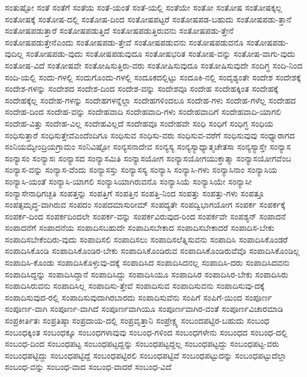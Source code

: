 {ಸಂತುಷ್ಟೋ
ಸಂತೆ
ಸಂತೆಗೆ
ಸಂತೆಯ
ಸಂತೆ-ಯಂತೆ
ಸಂತೆ-ಯಲ್ಲಿ
ಸಂತೆಯೇ
ಸಂತೋ
ಸಂತೋಷ
ಸಂತೋಷಕ್ಕಲ್ಲ
ಸಂತೋಷಕ್ಕೆ
ಸಂತೋಷ-ದಲ್ಲಿ
ಸಂತೋಷ-ದಿಂದ
ಸಂತೋಷಪಟ್ಟರೆ
ಸಂತೋಷಪಡ-ಬಹುದು
ಸಂತೋಷಪಡು-ತ್ತಾನೆ
ಸಂತೋಷಪಡುತ್ತಾರೆ
ಸಂತೋಷಪಡುತ್ತಿದೆ
ಸಂತೋಷಪಡುತ್ತಿರುವನು
ಸಂತೋಷಪಡು-ತ್ತೇನೆ
ಸಂತೋಷಪಡುತ್ತೇನೆಎಂದು
ಸಂತೋಷಪಡು-ತ್ತೇವೆ
ಸಂತೋಷಪಡುವನು
ಸಂತೋಷಪಡುವನೊ
ಸಂತೋಷಪಡು-ವುದಿಲ್ಲ
ಸಂತೋಷಪಡು-ವುದು
ಸಂತೋಷಪಡುವುದೂ
ಸಂತೋಷಭರಿತ
ಸಂತೋಷ-ವನ್ನು
ಸಂತೋಷ-ವಾಗು-ವುದು
ಸಂತೋಷ-ವಿದೆ
ಸಂತೋಷವೇ
ಸಂತೋಷಿಸುತ್ತಿರು-ವರು
ಸಂತೋಷಿಸುವುದೂ
ಸಂತೋಷಿಸುವುದೇ
ಸಂದಿಗ್ಧ
ಸಂದಿ-ನಿಂದ
ಸಂದಿ-ಯಲ್ಲಿ
ಸಂದು-ಗಳಲ್ಲಿ
ಸಂದುಗೊಂದು-ಗಳಲ್ಲಿ
ಸಂದೂಕದಲ್ಲಿಟ್ಟು
ಸಂದೂಕಿ-ನಲ್ಲಿ
ಸಂದೃಶ್ಯಂತೇ
ಸಂದೇಶ
ಸಂದೇಶಕ್ಕೆ
ಸಂದೇಶ-ಗಳನ್ನು
ಸಂದೇಶದ
ಸಂದೇಶ-ದಿಂದ
ಸಂದೇಶ-ವನ್ನು
ಸಂದೇಶವೂ
ಸಂದೇಹ
ಸಂದೇಹಕ್ಕಿಂತ
ಸಂದೇಹಕ್ಕೆ
ಸಂದೇಹಕ್ಕೆಲ್ಲ
ಸಂದೇಹ-ಗಳನ್ನು
ಸಂದೇಹಗಳನ್ನೆಲ್ಲಾ
ಸಂದೇಹಗಳಿಂದಲೂ
ಸಂದೇಹ-ಗಳು
ಸಂದೇಹ-ಗಳೆಲ್ಲ
ಸಂದೇಹದ
ಸಂದೇಹ-ದಿಂದ
ಸಂದೇಹ-ವನ್ನು
ಸಂದೇಹವಾದಿ
ಸಂದೇಹವಾದಿ-ಗಳು
ಸಂದೇಹವಾದಿಗೆ
ಸಂದೇಹವಾದಿ-ಯಾಗಲಿ
ಸಂದೇಹ-ವಿತ್ತು
ಸಂದೇಹ-ವಿಲ್ಲ
ಸಂದೇಹವಿಲ್ಲದೆ
ಸಂದೇಹವೂ
ಸಂದೇಹವೇ
ಸಂಧಿ
ಸಂಧಿಗೆ
ಸಂಧಿಗ್ಧ
ಸಂಧಿಯ
ಸಂಧಿಸುತ್ತಾರೆ
ಸಂಧಿಸುತ್ತೇವೆಎಂದೆಂದಿಗೂ
ಸಂಧಿಸುವ
ಸಂಧಿಸು-ವರು
ಸಂಧಿಸುವ-ವರೆಗೆ
ಸಂಧಿಸುವುವು
ಸಂಧ್ಯಾರಾಗದ
ಸಂನಿಯಮ್ಯೇಂದ್ರಿಯಗ್ರಾಮಂ
ಸಂನಿವಿಷ್ಟೋ
ಸಂನ್ಯಸನಾದೇವ
ಸಂನ್ಯಸ್ಯ
ಸಂನ್ಯಸ್ಯಾಧ್ಯಾತ್ಮಚೇತಸಾ
ಸಂನ್ಯಸ್ಯಾಸ್ತೇ
ಸಂನ್ಯಾಸ
ಸಂನ್ಯಾಸಂ
ಸಂನ್ಯಾಸಃ
ಸಂನ್ಯಾಸದ
ಸಂನ್ಯಾಸಮಿತಿ
ಸಂನ್ಯಾಸಯೋಗ
ಸಂನ್ಯಾಸಯೋಗಯುಕ್ತಾತ್ಮಾ
ಸಂನ್ಯಾಸಯೋಗವೆಂಬ
ಸಂನ್ಯಾಸ-ವನ್ನು
ಸಂನ್ಯಾಸ-ವೆಂದು
ಸಂನ್ಯಾಸಸ್ತು
ಸಂನ್ಯಾಸಸ್ಯ
ಸಂನ್ಯಾಸಿ
ಸಂನ್ಯಾಸಿ-ಗಳು
ಸಂನ್ಯಾಸಿನಾಂ
ಸಂನ್ಯಾಸಿಯ
ಸಂನ್ಯಾಸಿ-ಯಂತೆ
ಸಂನ್ಯಾಸಿ-ಯಾಗಲಿ
ಸಂನ್ಯಾಸಿಯಾಗಿರುವನೊ
ಸಂನ್ಯಾಸಿಯೆ
ಸಂನ್ಯಾಸಿಯೇ
ಸಂನ್ಯಾಸೀ
ಸಂನ್ಯಾಸೇನಾಧಿಗಚ್ಛತಿ
ಸಂಪತ್ತನ್ನು
ಸಂಪತ್ತಿಗೆ
ಸಂಪತ್ತಿನ
ಸಂಪತ್ತಿ-ನಿಂದ
ಸಂಪತ್ತು
ಸಂಪತ್ತು-ಗಳು
ಸಂಪತ್ತೂ
ಸಂಪತ್ಸಮೃದ್ಧ-ವಾಗಿರುವ
ಸಂಪದಂ
ಸಂಪದಮಾಸುರೀಮ್
ಸಂಪದ್ಯತೇ
ಸಂಪದ್ವಿಭಾಗಯೋಗ
ಸಂಪರ್ಕ
ಸಂಪರ್ಕಕ್ಕೆ
ಸಂಪರ್ಕ-ದಿಂದ
ಸಂಪರ್ಕದಿಂದಲೇ
ಸಂಪರ್ಕ-ವನ್ನು
ಸಂಪರ್ಕವಿರುವುದ-ರಿಂದ
ಸಂಪರ್ಕವೇ
ಸಂಪಶ್ಯನ್
ಸಂಪಾದನೆ
ಸಂಪಾದನೆಗೆ
ಸಂಪಾದನೆಯ
ಸಂಪಾದಿಸಬಹುದೇ
ಸಂಪಾದಿಸಬೇಕಾದ
ಸಂಪಾದಿಸಬೇಕಾದರೆ
ಸಂಪಾದಿಸ-ಬೇಕು
ಸಂಪಾದಿಸಬೇಕೆಂದಿರು-ವುದು
ಸಂಪಾದಿಸಲಿ
ಸಂಪಾದಿಸಲು
ಸಂಪಾದಿಸಲೆತ್ನಿಸುವನು
ಸಂಪಾದಿಸಿ
ಸಂಪಾದಿಸಿಕೊಂಡರೆ
ಸಂಪಾದಿಸಿಕೊಂಡಿ
ಸಂಪಾದಿಸಿಕೊಂಡಿರ-ಬೇಕು
ಸಂಪಾದಿಸಿಕೊಂಡಿರುವ
ಸಂಪಾದಿಸಿಕೊಂಡಿರುವೆವೊ
ಸಂಪಾದಿಸಿಕೊಂಡಿಲ್ಲ
ಸಂಪಾದಿಸಿ-ಕೊಂಡು
ಸಂಪಾದಿಸಿಕೊಳ್ಳುವು-ದಕ್ಕೆ
ಸಂಪಾದಿಸಿದ
ಸಂಪಾದಿಸಿದನಲ್ಲ
ಸಂಪಾದಿಸಿ-ದರು
ಸಂಪಾದಿಸಿದವನು
ಸಂಪಾದಿಸಿದ್ದನ್ನು
ಸಂಪಾದಿಸಿದ್ದಾನೆ
ಸಂಪಾದಿಸಿದ್ದು
ಸಂಪಾದಿಸಿಯೂ
ಸಂಪಾದಿಸಿರ
ಸಂಪಾದಿಸಿರ-ಬೇಕು
ಸಂಪಾದಿಸಿರು
ಸಂಪಾದಿಸಿರುವನು
ಸಂಪಾದಿಸಿಲ್ಲ
ಸಂಪಾದಿಸು-ತ್ತೇವೆ
ಸಂಪಾದಿಸುವ
ಸಂಪಾದಿಸುವನು
ಸಂಪಾದಿಸುವು-ದಕ್ಕೆ
ಸಂಪಾದಿಸುವುದ-ರಲ್ಲಿ
ಸಂಪಾದಿಸುವುದಾಗಿರಬಾರದು
ಸಂಪಾದಿಸುವೆನು
ಸಂಪಿಗೆ
ಸಂಪಿಗೆ-ಯಿಂದ
ಸಂಪೂರ್ಣ
ಸಂಪೂರ್ಣ-ವಾಗಿ
ಸಂಪೂರ್ಣ-ವಾಗಿದೆ
ಸಂಪೂರ್ಣವಾಗಿಯೂ
ಸಂಪೂರ್ಣವಾಗಿರ-ವಂತೆ
ಸಂಪೂರ್ಣವಿಚಾರಮಾಡಿ
ಸಂಪ್ರಕೀರ್ತಿತಃ
ಸಂಪ್ರತಿಷ್ಠಾ
ಸಂಪ್ರದಾಯ-ದಲ್ಲಿ
ಸಂಪ್ರವೃತ್ತಾನಿ
ಸಂಪ್ರೇಕ್ಷ್ಯ
ಸಂಬಂದಪಟ್ಟಿರ-ಬಹುದು
ಸಂಬಂಧ
ಸಂಬಂಧಕ್ಕಿಂತ
ಸಂಬಂಧಕ್ಕೂ
ಸಂಬಂಧಗಳಾವುವು
ಸಂಬಂಧ-ಗಳಿಂದ
ಸಂಬಂಧಗಳೇನು
ಸಂಬಂಧದ
ಸಂಬಂಧ-ದಲ್ಲಿ
ಸಂಬಂಧ-ದಿಂದ
ಸಂಬಂಧಪಟ್ಟ
ಸಂಬಂಧಪಟ್ಟದ್ದನ್ನು
ಸಂಬಂಧಪಟ್ಟದ್ದಲ್ಲ
ಸಂಬಂಧಪಟ್ಟದ್ದು
ಸಂಬಂಧಪಟ್ಟ-ವರು
ಸಂಬಂಧಪಟ್ಟಿದ್ದು
ಸಂಬಂಧಪಟ್ಟಿದ್ದೆ
ಸಂಬಂಧಪಟ್ಟಿರಲಿ
ಸಂಬಂಧಪಟ್ಟಿವೆ
ಸಂಬಂಧಪಟ್ಟುದನ್ನು
ಸಂಬಂಧಪಟ್ಟುದೆಲ್ಲಾ
ಸಂಬಂಧ-ವನ್ನು
ಸಂಬಂಧ-ವಾದ
ಸಂಬಂಧ-ವಾದರೆ
ಸಂಬಂಧ-ವಿದೆ
}
